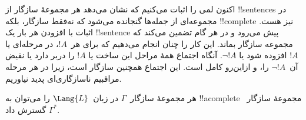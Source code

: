 \documentclass[../../../include/open-logic-section]{subfiles}
\begin{document}
      {}
      {}


\begin{explain}
اکنون لمی را اثبات می‌کنیم که نشان می‌دهد هر مجموعهٔ سازگار از
!!{sentence}s در مجموعه‌ای از جمله‌ها گنجانده می‌شود که نه‌فقط سازگار،
بلکه !!{complete} نیز هست. اثبات با افزودن هر بار یک !!{sentence} پیش
می‌رود و در هر گام تضمین می‌کند که مجموعه سازگار بماند. این کار را چنان
انجام می‌دهیم که برای هر~$!A$، در مرحله‌ای یا $!A$ افزوده شود یا
$\lnot !A$. آنگاه اجتماع همهٔ مراحل این ساخت یا $!A$ را دربر دارد یا
نقیض آن~$\lnot !A$ را، و ازاین‌رو کامل است. این اجتماع همچنین سازگار
است، زیرا در هر مرحله مراقبیم ناسازگاری‌ای پدید نیاوریم.
\end{explain}

\begin{lem}[لم لیندنباوم]
 هر مجموعهٔ سازگار~$\Gamma$ در زبان~$\Lang{L}$
را می‌توان به !!a{complete} مجموعهٔ سازگار~$\Gamma^*$ گسترش داد.
\end{lem}
\end{document}
